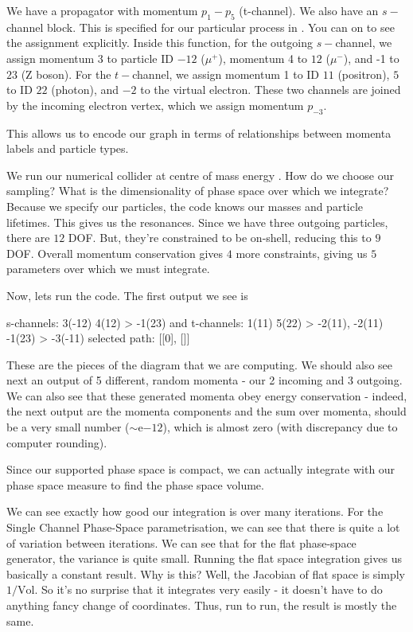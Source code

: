We have a propagator with momentum $p_1-p_5$ (t-channel). We also have an $s-$channel block. This is specified for our particular process in . You can  on   to see the assignment explicitly. Inside this function, for the outgoing $s-$channel,  we assign momentum 3 to particle ID $-12$ ($\mu^+$), momentum 4 to $12$ ($\mu^-$), and -1 to $23$ (Z boson). For the $t-$channel, we assign momentum 1 to ID $11$ (positron), $5$ to ID $22$ (photon), and $-2$ to the virtual electron. These two channels are joined by the incoming electron vertex, which we assign momentum $p_{-3}$.

This allows us to encode our graph in terms of relationships between momenta labels and particle types.

We run our numerical collider at centre of mass energy . 
How do we choose our sampling? What is the dimensionality of phase space over which we integrate? Because we specify our particles, the code knows our masses and particle lifetimes. This gives us the resonances. Since we have three outgoing particles, there are $12$ DOF. But, they're constrained to be on-shell, reducing this to $9$ DOF. Overall momentum conservation gives $4$ more constraints, giving us $5$ parameters over which we must integrate.

Now, lets run the code. The first output we see is
\begin{codeenv}
    s-channels:     3(-12) 4(12) > -1(23)
and t-channels: 1(11) 5(22) > -2(11), -2(11) -1(23) > -3(-11)
selected path:  [[0], []]
\end{codeenv}
These are the pieces of the diagram that we are computing.
We should also see next an output of 5 different, random momenta - our 2 incoming and 3 outgoing. We can also see that these generated momenta obey energy conservation - indeed, the next output are the momenta components and the sum over momenta, should be a very small number ($\sim$e$-12$), which is almost zero (with discrepancy due to computer rounding).

Since our supported phase space is compact, we can actually integrate with our phase space measure to find the phase space volume.

We can see exactly how good our integration is over many iterations. For the Single Channel Phase-Space parametrisation, we can see that there is quite a lot of variation between iterations. We can see that for the flat phase-space generator, the variance is quite small.  Running the flat space integration gives us basically a constant result. Why is this? Well, the Jacobian of flat space is simply $1/\text{Vol}$. So it's no surprise that it integrates very easily - it doesn't have to do anything fancy change of coordinates. Thus, run to run, the result is mostly the same.

